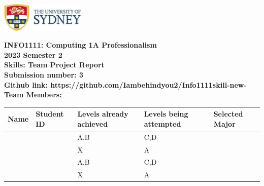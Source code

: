 \documentclass[a4paper, 11pt]{report}
\begin{document}
\begin{titlepage}
\begin{flushright}
\includegraphics[width=4cm]{USyd}\\[2cm]
\end{flushright}
\center 
\textbf{\huge INFO1111: Computing 1A Professionalism}\\[0.75cm]
\textbf{\huge 2023 Semester 2}\\[2cm]
\textbf{\huge Skills: Team Project Report}\\[3cm]

\textbf{\huge Submission number: 3}\\[0.75cm]
\textbf{Github link: https://github.com/Iambehindyou2/Info1111skill-new-}\\[0.75cm]
\textbf{\huge Team Members:}\\[0.75cm]

\begin{tabular}{|p{}|p{}|p{}|p{}|p{}|}
	\hline
	Name & Student ID & \raggedright{Levels already achieved} & \raggedright{Levels being attempted} & Selected Major \\
	\hline
	\hline
	\raggedright{\studA} & \sidA & A,B & C,D& \majA \\
	\raggedright{\studB} & \sidB & X & A& \majB \\
	\raggedright{\studC} & \sidC & A,B & C,D & \majC \\
	\raggedright{\studD} & \sidD & X & A & \majD \\
	\hline
\end{tabular}
\thispagestyle{empty}
\end{titlepage}


\newpage
\end{document}
